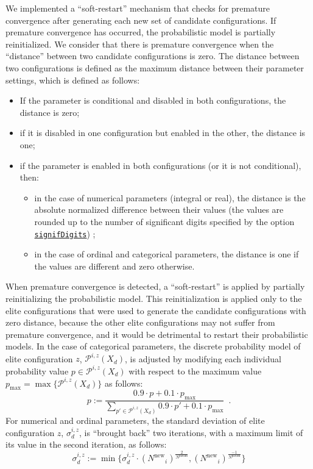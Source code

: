 \documentclass[a4paper]{article}
\newcommand{\assign}{\ensuremath{:=}}
\newcommand{\iter}{\ensuremath{i}\xspace}
\newcommand{\Nparam}{\ensuremath{{N^\text{param}}}\xspace}
\newcommand{\Nnew}{\ensuremath{N^\text{new}}\xspace}
\newcommand{\parameter}[1]{\hyperlink{opt:#1}{\texttt{#1}}}
\begin{document}
We implemented a ``soft-restart'' mechanism that checks for premature
convergence after generating each new set of candidate configurations. If
premature convergence has occurred, the probabilistic model is
partially reinitialized. We consider that there is premature
convergence when the ``distance'' between two candidate
configurations is zero. The
distance between two configurations is defined as the maximum distance
between their parameter settings, which is defined as follows:

\begin{itemize}
\item If the parameter is conditional and disabled in both configurations, the distance is zero;
\item if it is disabled in one configuration but enabled in the other,
  the distance is one;
\item if the parameter is enabled in both configurations (or it is not conditional), then: 

  \begin{itemize}
  \item in the case of numerical parameters (integral or real), the
  distance is the absolute normalized difference between
  their values (the values are rounded up to the number of significant digits specified by the option \parameter{signifDigits}) ;
\item in the case of ordinal and categorical parameters, the distance
  is one if the values are different and zero otherwise.
\end{itemize}
\end{itemize}

When premature convergence is detected, a ``soft-restart'' is applied
by partially reinitializing the probabilistic model. This
reinitialization is applied only to the elite configurations that were
used to generate the candidate configurations with zero distance,
because the other elite configurations may not suffer from premature
convergence, and it would be detrimental to restart their
probabilistic models. In the case of categorical parameters, the
discrete probability model of elite configuration $z$,
$\mathcal{P}^{\iter,z}(X_d)$, is adjusted by modifying each individual
probability value $p \in \mathcal{P}^{\iter,z}(X_d)$ with respect to
the maximum value $p_\text{max} = \max\{\mathcal{P}^{\iter,z}(X_d)\}$
as follows:
%
\[p \assign \frac{0.9 \cdot p + 0.1 \cdot p_\text{max}}{\sum_{p' \in \mathcal{P}^{\iter,z}(X_d)} 0.9 \cdot p' + 0.1 \cdot p_\text{max}}\enspace.\]
%
For numerical and ordinal parameters, the standard deviation of elite configuration $z$, $\sigma_d^{\iter,z}$, is ``brought back'' two iterations, with a maximum limit of its value in the second iteration, as follows:
\[
  \sigma_d^{\iter,z} \assign \min\{ \sigma_d^{\iter,z} \cdot {(\Nnew_i)}^{\frac{2}{\Nparam}},
{(\Nnew_i)}^{\frac{-1}{\Nparam}}\}
\]
\end{document}
